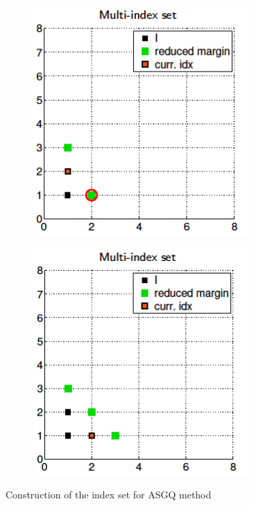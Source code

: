 \documentclass[ima, 20pt, portrait, plainboxedsections]{sciposter}
\begin{document}
\begin{multicols}{3}
\begin{itemize}
\begin{figure}
\begin{subfigure}{0.32\textwidth}
	\caption{}
\end{subfigure}\hfil
\begin{subfigure}{0.32\textwidth}
	\centering
	\includegraphics[width=0.9\textwidth]{./MISC_construction/5}
	\caption{}
\end{subfigure}\hfil
\begin{subfigure}{0.32\textwidth}
	\centering
	\includegraphics[width=0.9\textwidth]{./MISC_construction/6}
	\caption{}
\end{subfigure}%
	\caption{Construction of the index set for ASGQ method}
\end{figure}



\end{itemize}
\end{multicols}
\end{document}
